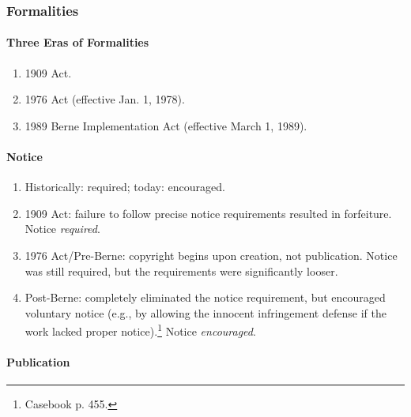 \subsubsection{Formalities}

\paragraph{Three Eras of Formalities}

\begin{enumerate}
    \item 1909 Act.
    \item 1976 Act (effective Jan. 1, 1978).
    \item 1989 Berne Implementation Act (effective March 1, 1989).
\end{enumerate}

\paragraph{Notice}

\begin{enumerate}
    \item Historically: required; today: encouraged.
    \item 1909 Act: failure to follow precise notice requirements resulted in 
    forfeiture. Notice \emph{required}.
    \item 1976 Act/Pre-Berne: copyright begins upon creation, not 
    publication. Notice was still required, but the requirements were 
    significantly looser.
    \item Post-Berne: completely eliminated the notice requirement, but 
    encouraged voluntary notice (e.g., by allowing the innocent infringement 
    defense if the work lacked proper notice).\footnote{Casebook p. 455.} 
    Notice \emph{encouraged}.
\end{enumerate}

\paragraph{Publication}

